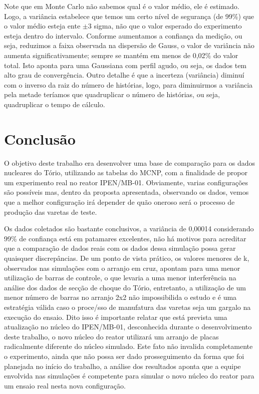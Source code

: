 \documentclass[
	12pt,				%
	openany,			%
	twoside,			%
	a4paper,			%
	english,			%
	french,				%
	spanish,			%
	brazil				%
	]{abntex2}
\begin{document}
Note que em Monte Carlo não sabemos qual é o valor médio, ele é estimado. Logo, a variância estabelece que temos um certo nível de segurança (de 99\%) que o valor médio esteja ente  $\pm$3 sigma, não que o valor esperado do experimento esteja dentro do intervalo. Conforme aumentamos a confiança da medição, ou seja, reduzimos a faixa observada na dispersão de Gauss, o valor de variância não aumenta significativamente; sempre se mantém em menos de 0,02\% do valor total. Isto aponta para uma Gaussiana com perfil agudo, ou seja, os dados tem alto grau de convergência. Outro detalhe é que a incerteza (variância) diminuí com o inverso da raiz do número de histórias, logo, para diminuirmos a variância pela metade teríamos que quadruplicar o número de histórias, ou seja, quadruplicar o tempo de cálculo.

\chapter{Conclusão}

O objetivo deste trabalho era desenvolver uma base de comparação para os dados nucleares do Tório, utilizando as tabelas do MCNP, com a finalidade de propor um experimento real no reator IPEN/MB-01. Obviamente, varias configurações são possíveis mas, dentro da proposta apresentada, observando os dados, vemos que a melhor configuração irá depender de quão oneroso será o processo de produção das varetas de teste. 

Os dados coletados são bastante conclusivos, a variância de 0,00014 considerando 99\% de confiança está em patamares excelentes, não há motivos para acreditar que a comparação de dados reais com os dados dessa simulação possa gerar quaisquer discrepâncias.  De um ponto de vista prático, os valores menores de k, observados nas simulações com o arranjo em cruz, apontam para uma menor utilização de barras de controle, o que levaria a uma menor interferência na análise dos dados de secção de choque do Tório, entretanto, a utilização de um menor número de barras no arranjo 2x2 não impossibilida o estudo e é uma estratégia válida caso o proce/sso de manufatura das varetas seja um gargalo na execução do ensaio. Dito isso é importante relatar que está prevista uma atualização no núcleo do IPEN/MB-01, desconhecida durante o desenvolvimento deste trabalho, o novo núcleo do reator utilizará um arranjo de placas radicalmente diferente do núcleo simulado. Este fato não invalida completamente o experimento, ainda que não possa ser dado prosseguimento da forma que foi planejada no início do trabalho, a análise dos resultados aponta que a equipe envolvida nas simulações é competente para simular o novo núcleo do reator para um ensaio real nesta nova configuração.
\end{document}
